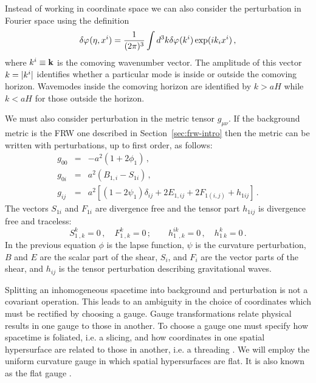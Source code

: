 Instead of working in coordinate space we can also consider
the perturbation in Fourier space using the definition
% 
\begin{equation}
\label{eq:fourierdefn-intro}
 \delta\varphi_{}(\eta, x^i) = \frac{1}{(2 \pi)^3} \int d^3k \delta\varphi_{}(k^i) \exp (i k_i x^i)
\,,
\end{equation}
where $k^i\equiv \textbf{k}$ is the comoving wavenumber vector. The amplitude of this
vector $k=|k^i|$ identifies whether a particular mode is inside or outside
the comoving horizon. Wavemodes inside the comoving horizon are identified by
$k>aH$ while $k<aH$ for those outside the horizon. 


We must also consider perturbation in the metric tensor $g_{\mu\nu}$. If the
background metric is the FRW one described in Section~\ref{sec:frw-intro} then
the metric can be written with perturbations, up to first order, as follows:
% 
\begin{eqnarray}
 \label{eq:pertmetric-intro}
 g_{00} &=& -a^2 (1 + 2\phi_1) \,,\\
 g_{0i} &=& a^2 (B_{1,i} - S_{1i}) \,,\\
 g_{ij} &=& a^2\left[ (1 - 2\psi_1)\delta_{ij} + 2E_{1,ij} + 2F_{1(i,j)} +
h_{1ij}
\right] \,.
\end{eqnarray}
% 
The vectors $S_{1i}$ and $F_{1i}$ are divergence free and the tensor part
$h_{1ij}$
is divergence free and traceless:
% 
\begin{equation}
 S^k_{1~,k} = 0\,, \quad F^k_{1~,k}=0\,; \qquad h^{ik}_{1~~,k} = 0\,,
  \quad h^k_{1~k}= 0\,.
\end{equation}
% 
In the previous equation $\phi$ is the lapse function, $\psi$ is the curvature
perturbation, $B$ and $E$ are the scalar part of the shear, $S_i$, and $F_i$
are the vector parts of the shear, and $h_{ij}$ is the tensor perturbation
describing gravitational waves.


Splitting an inhomogeneous spacetime into background and perturbation is not a
covariant operation. This leads to an ambiguity in the choice of coordinates
which must be rectified by choosing a gauge. Gauge transformations relate
physical results in one gauge to those in another. To choose a gauge one must
specify how spacetime is foliated, i.e. a slicing, and how coordinates in one
spatial hypersurface are related to those in another, i.e. a threading
\cite{Malik:2008im}. We will
employ the uniform curvature gauge in which spatial hypersurfaces are flat. It
is also known as the flat gauge .

